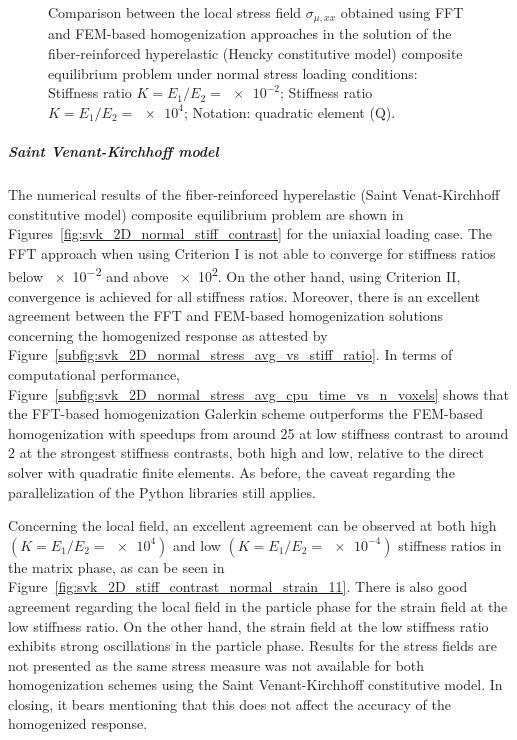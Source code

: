 \begin{figure}[hbt]
\begin{subfigure}[b]{\textwidth}
    \caption{}
    \label{subfig:hencky_2D_ratio_-4_normal_stress_11}
  \end{subfigure}
  \caption{Comparison between the local stress field \(\sigma_{\mu,xx}\) obtained using
  FFT and FEM-based homogenization approaches in the solution of the fiber-reinforced
  hyperelastic (Hencky constitutive model) composite equilibrium problem under normal stress loading conditions:
   Stiffness ratio \(K=E_1/E_2=\num{e-2}\);
   Stiffness ratio \(K=E_1/E_2=\num{e4}\);
  Notation: quadratic element (Q).}
\label{fig:hencky_2D_stiff_contrast_normal_stress_11}
\end{figure}

\FloatBarrier

\subparagraph{Saint Venant-Kirchhoff model}

The numerical results of the fiber-reinforced hyperelastic (Saint Venat-Kirchhoff constitutive model) composite equilibrium problem are shown in Figures~\ref{fig:svk_2D_normal_stiff_contrast} for the uniaxial loading case.
The FFT approach when using Criterion I is not able to converge for stiffness ratios below \num{e-2} and above \num{e2}.
On the other hand, using Criterion II, convergence is achieved for all stiffness ratios.
Moreover, there is an excellent agreement between the FFT and FEM-based homogenization solutions concerning the homogenized response as attested by Figure~\ref{subfig:svk_2D_normal_stress_avg_vs_stiff_ratio}.
In terms of computational performance, Figure~\ref{subfig:svk_2D_normal_stress_avg_cpu_time_vs_n_voxels} shows that the FFT-based homogenization Galerkin scheme outperforms the FEM-based homogenization with speedups from around 25 at low stiffness contrast to around 2 at the strongest stiffness contrasts, both high and low, relative to the direct solver with quadratic finite elements.
As before, the caveat regarding the parallelization of the Python libraries still applies.

Concerning the local field, an excellent agreement can be observed at both high \((K=E_1/E_2=\num{e4})\) and low \((K=E_1/E_2=\num{e-4})\) stiffness ratios in the matrix phase, as can be seen in Figure~\ref{fig:svk_2D_stiff_contrast_normal_strain_11}.
There is also good agreement regarding the local field in the particle phase for the strain field at the low stiffness ratio.
On the other hand, the strain field at the low stiffness ratio exhibits strong oscillations in the particle phase.
Results for the stress fields are not presented as the same stress measure was not available for both homogenization schemes using the Saint Venant-Kirchhoff constitutive model.
In closing, it bears mentioning that this does not affect the accuracy of the homogenized response.

